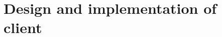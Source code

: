 \documentclass[Main]{subfiles}
\begin{document}
\section{Design and implementation of client}








\end{document}
